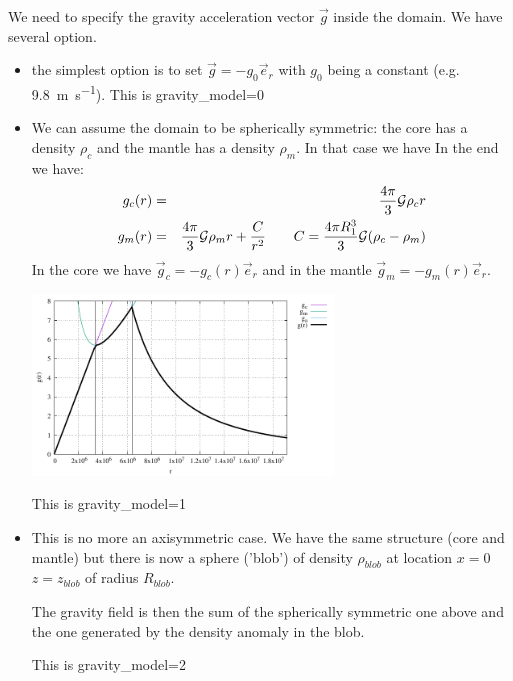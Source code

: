 
We need to specify the gravity acceleration vector $\vec{g}$
inside the domain. 
We have several option. 

\begin{itemize}
\item the simplest option is to set $\vec{g} = - g_0 \vec{e}_r$
with $g_0$ being a constant (e.g. 9.8~\si{\meter\per\second}).
This is {\python gravity\_model=0}


\item We can assume the domain to be spherically symmetric: 
the core has a density $\rho_c$ and the mantle has a density $\rho_m$.
In that case we have
In the end we have:
\begin{eqnarray}
g_c(r)&=& \frac{4\pi}{3} {\cal G}{\rho}_c r \nonumber\\ 
g_m(r)&=& \frac{4\pi}{3} {\cal G}{\rho}_m r +\frac{C}{r^2} 
\qquad C=\frac{4\pi R_1^3}{3} {\cal G} ({\rho}_c-{\rho}_m)
\end{eqnarray}
In the core we have $\vec{g}_c = - g_c(r) \vec{e}_r$
and in the mantle  $\vec{g}_m = - g_m(r) \vec{e}_r$.

\begin{center}
\includegraphics[width=8cm]{images/bench/g}
\end{center}

This is {\python gravity\_model=1}

\item This is no more an axisymmetric case. We have the same 
structure (core and mantle) but there is now a sphere ('blob')
of density $\rho_{blob}$ at location $x=0$ $z=z_{blob}$ of 
radius $R_{blob}$. 

The gravity field is then the sum of the spherically symmetric one 
above and the one generated by the density anomaly in the blob.

This is {\python gravity\_model=2}

\end{itemize}

